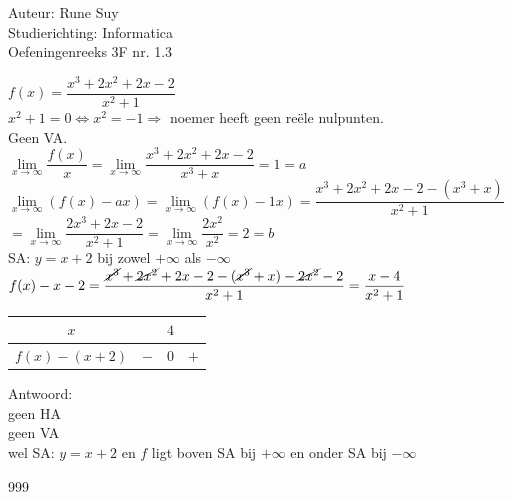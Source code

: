 \documentclass[a4paper]{article}
\newcommand{\limit}{\lim\limits}
\begin{document}
  
\noindent \large Auteur: Rune Suy \\
\noindent \large Studierichting: Informatica\\
\noindent \large Oefeningenreeks 3F nr. 1.3\\

\medskip

\normalsize

$f(x)=\dfrac{x^3 + 2x^2 + 2x - 2}{x^2 + 1}$\\

$x^2 + 1 = 0 \Leftrightarrow x^2 = -1 \Rightarrow$ noemer heeft geen reële nulpunten.\\

Geen VA.\\

$\limit_{x \rightarrow \infty} \dfrac{f(x)}{x} = \limit_{x \rightarrow \infty}\dfrac{x^3 + 2x^2 + 2x - 2}{x^3 + x} = 1 = a$\\

$\limit_{x\rightarrow \infty} (f(x) - ax) = \limit_{x\rightarrow \infty} (f(x) - 1x) = \dfrac{x^3 + 2x^2 + 2x - 2 - (x^3 + x)}{x^2 + 1}$\\

$=\limit_{x\rightarrow \infty} \dfrac{2x^3 + 2x - 2}{x^2 + 1} = \limit_{x\rightarrow \infty}\dfrac{2x^2}{x^2} = 2 = b$\\

SA: $y = x + 2$ bij zowel $+\infty$ als $-\infty$\\

$f(x) - x - 2 = \dfrac{\cancel{x^3} + \cancel{2x^2} + 2x - 2 - (\cancel{x^3} + x) - \cancel{2x^2} - 2}{x^2 + 1} = \dfrac{x-4}{x^2 + 1}$\\

\begin{tabular}{c|c c c}
    $x$         &       & $4$ & \\ \hline
    $f(x)-(x+2)$& $-$   & $0$ & $+$ \\
\end{tabular}

\bigskip

Antwoord: \\

geen HA\\

geen VA\\

wel SA: $y = x + 2$ en $f$ ligt boven SA bij $+\infty$ en onder SA bij $-\infty$\\

\begin{thebibliography}{999}
\end{thebibliography}
\end{document}
